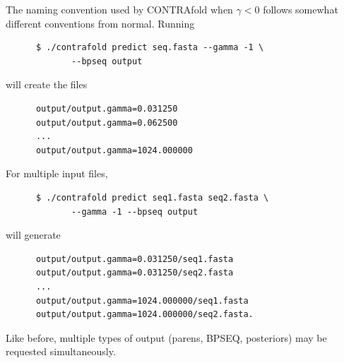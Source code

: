 \documentclass{article}
\begin{document}
\begin{description}
    The naming convention used by CONTRAfold when $\gamma < 0$ follows somewhat
    different conventions from normal.  Running
    \begin{verbatim}
      $ ./contrafold predict seq.fasta --gamma -1 \
             --bpseq output\end{verbatim}
    will create the files
    \begin{verbatim}
      output/output.gamma=0.031250
      output/output.gamma=0.062500
      ...
      output/output.gamma=1024.000000\end{verbatim}
    For multiple input files,
    \begin{verbatim}
      $ ./contrafold predict seq1.fasta seq2.fasta \
             --gamma -1 --bpseq output\end{verbatim}
    will generate 
    \begin{verbatim}
      output/output.gamma=0.031250/seq1.fasta
      output/output.gamma=0.031250/seq2.fasta
      ...
      output/output.gamma=1024.000000/seq1.fasta
      output/output.gamma=1024.000000/seq2.fasta.\end{verbatim}

    Like before, multiple types of output (parens, BPSEQ, posteriors) may
    be requested simultaneously.


\end{description}
\end{document}
